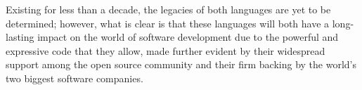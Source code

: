 \documentclass[letterpaper]{article}
\begin{document}
Existing for less than a decade, the legacies of both languages are yet to be determined; however, what is clear is that these languages will both have a long-lasting impact on the world of software development due to the powerful and expressive code that they allow, made further evident by their widespread support among the open source community and their firm backing by the world's two biggest software companies.
\end{document}
